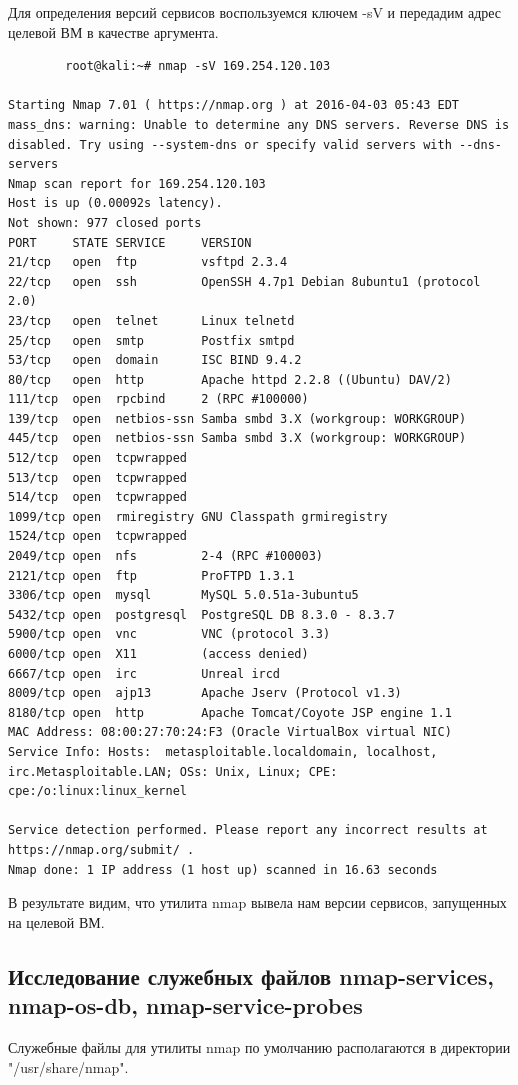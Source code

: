 \documentclass[10pt,a4paper]{report}
\begin{document}
	Для определения версий сервисов воспользуемся ключем -sV и передадим адрес целевой ВМ в качестве аргумента.
		\begin{verbatim}
		root@kali:~# nmap -sV 169.254.120.103

Starting Nmap 7.01 ( https://nmap.org ) at 2016-04-03 05:43 EDT
mass_dns: warning: Unable to determine any DNS servers. Reverse DNS is disabled. Try using --system-dns or specify valid servers with --dns-servers
Nmap scan report for 169.254.120.103
Host is up (0.00092s latency).
Not shown: 977 closed ports
PORT     STATE SERVICE     VERSION
21/tcp   open  ftp         vsftpd 2.3.4
22/tcp   open  ssh         OpenSSH 4.7p1 Debian 8ubuntu1 (protocol 2.0)
23/tcp   open  telnet      Linux telnetd
25/tcp   open  smtp        Postfix smtpd
53/tcp   open  domain      ISC BIND 9.4.2
80/tcp   open  http        Apache httpd 2.2.8 ((Ubuntu) DAV/2)
111/tcp  open  rpcbind     2 (RPC #100000)
139/tcp  open  netbios-ssn Samba smbd 3.X (workgroup: WORKGROUP)
445/tcp  open  netbios-ssn Samba smbd 3.X (workgroup: WORKGROUP)
512/tcp  open  tcpwrapped
513/tcp  open  tcpwrapped
514/tcp  open  tcpwrapped
1099/tcp open  rmiregistry GNU Classpath grmiregistry
1524/tcp open  tcpwrapped
2049/tcp open  nfs         2-4 (RPC #100003)
2121/tcp open  ftp         ProFTPD 1.3.1
3306/tcp open  mysql       MySQL 5.0.51a-3ubuntu5
5432/tcp open  postgresql  PostgreSQL DB 8.3.0 - 8.3.7
5900/tcp open  vnc         VNC (protocol 3.3)
6000/tcp open  X11         (access denied)
6667/tcp open  irc         Unreal ircd
8009/tcp open  ajp13       Apache Jserv (Protocol v1.3)
8180/tcp open  http        Apache Tomcat/Coyote JSP engine 1.1
MAC Address: 08:00:27:70:24:F3 (Oracle VirtualBox virtual NIC)
Service Info: Hosts:  metasploitable.localdomain, localhost, irc.Metasploitable.LAN; OSs: Unix, Linux; CPE: cpe:/o:linux:linux_kernel

Service detection performed. Please report any incorrect results at https://nmap.org/submit/ .
Nmap done: 1 IP address (1 host up) scanned in 16.63 seconds

		\end{verbatim}	
		
		В результате видим, что утилита nmap вывела нам версии сервисов, запущенных на целевой ВМ.
		
	\subsection{Исследование служебных файлов nmap-services, nmap-os-db, nmap-service-probes}
		Служебные файлы для утилиты nmap по умолчанию располагаются в директории "/usr/share/nmap".
\end{document}
